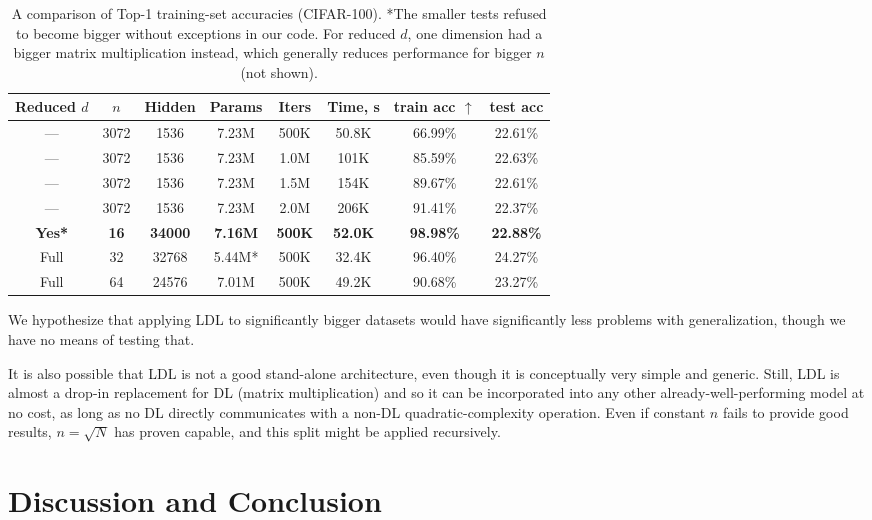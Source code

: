 \documentclass{article}
\begin{document}
\begin{table}
\begin{center}
\begin{tabular}{cccccccc}
\hline
Reduced $d$ & $n$ & Hidden & Params & Iters & Time, s & train acc $\uparrow$ & test acc \\
\hline
--- & 3072 & 1536 & 7.23M & 500K & 50.8K & 66.99\% & 22.61\% \\
--- & 3072 & 1536 & 7.23M & 1.0M & 101K & 85.59\% & 22.63\% \\
--- & 3072 & 1536 & 7.23M & 1.5M & 154K & 89.67\% & 22.61\% \\
--- & 3072 & 1536 & 7.23M & 2.0M & 206K & 91.41\% & 22.37\% \\
\hline
\textbf{Yes*} & \textbf{16} & \textbf{34000} & \textbf{7.16M} & \textbf{500K} & \textbf{52.0K} & \textbf{98.98\%} & \textbf{22.88\%} \\
Full & 32 & 32768 & 5.44M* & 500K & 32.4K & 96.40\% & 24.27\% \\
Full & 64 & 24576 & 7.01M & 500K & 49.2K & 90.68\% & 23.27\% \\
\hline
\end{tabular}
\end{center}
\caption{A comparison of Top-1 training-set accuracies (CIFAR-100). *The smaller tests refused to become bigger without exceptions in our code. For reduced $d$, one dimension had a bigger matrix multiplication instead, which generally reduces performance for bigger $n$ (not shown).}
\label{LDLimages}
\end{table}

We hypothesize that applying LDL to significantly bigger datasets would have significantly less problems with generalization, though we have no means of testing that.

It is also possible that LDL is not a good stand-alone architecture, even though it is conceptually very simple and generic. Still, LDL is almost a drop-in replacement for DL (matrix multiplication) and so it can be incorporated into any other already-well-performing model at no cost, as long as no DL directly communicates with a non-DL quadratic-complexity operation. Even if constant $n$ fails to provide good results, $n=\sqrt{N}$ has proven capable, and this split might be applied recursively.

\section{Discussion and Conclusion}
\end{document}
